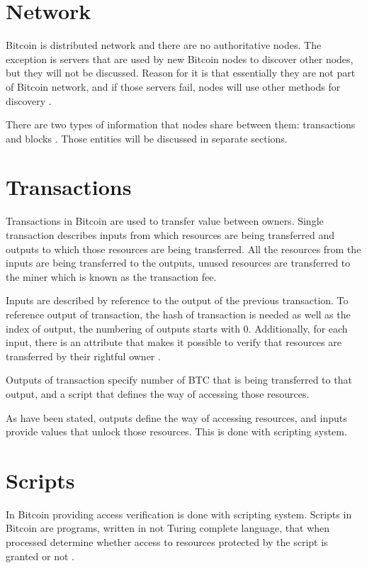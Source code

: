 \documentclass[12pt, en, eng, oneside, final]{mgr}
\begin{document}
\section{Network}
Bitcoin is distributed network and there are no authoritative nodes. The exception is servers that are used by new Bitcoin nodes to discover other nodes, but they will not be discussed. Reason for it is that essentially they are not part of Bitcoin network, and if those servers fail, nodes will use other methods for discovery \cite{bitcoin-paper-1}.

There are two types of information that nodes share between them: transactions and blocks \cite{bitcoin-paper-1}. Those entities will be discussed in separate sections.

\section{Transactions}
Transactions in Bitcoin are used to transfer value between owners. Single transaction describes inputs from which resources are being transferred and outputs to which those resources are being transferred. All the resources from the inputs are being transferred to the outputs, unused resources are transferred to the miner which is known as the transaction fee.

Inputs are described by reference to the output of the previous transaction. To reference output of transaction, the hash of transaction is needed as well as the index of output, the numbering of outputs starts with 0. Additionally, for each input, there is an attribute that makes it possible to verify that resources are transferred by their rightful owner \cite{bitcoin-transaction}.

Outputs of transaction specify number of BTC that is being transferred to that output, and a script that defines the way of accessing those resources. 

As have been stated, outputs define the way of accessing resources, and inputs provide values that unlock those resources. This is done with scripting system.

\section{Scripts}
In Bitcoin providing access verification is done with scripting system. Scripts in Bitcoin are programs, written in not Turing complete language, that when processed determine whether access to resources protected by the script is granted or not \cite{bitcoin-script}.
\end{document}
